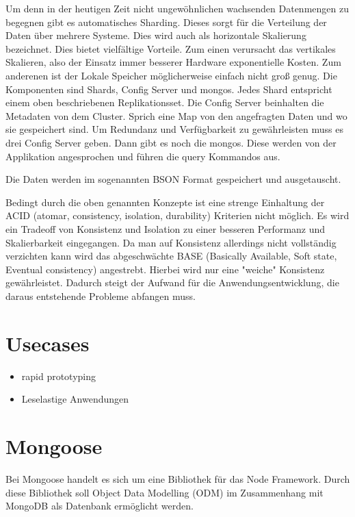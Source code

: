Um denn in der heutigen Zeit nicht ungewöhnlichen wachsenden Datenmengen
zu begegnen gibt es automatisches Sharding. Dieses sorgt für die
Verteilung der Daten über mehrere Systeme. Dies wird auch als
horizontale Skalierung bezeichnet. Dies bietet vielfältige Vorteile. Zum
einen verursacht das vertikales Skalieren, also der Einsatz immer
besserer Hardware exponentielle Kosten. Zum anderenen ist der Lokale
Speicher möglicherweise einfach nicht groß genug. Die Komponenten sind
Shards, Config Server und mongos. Jedes Shard entspricht einem oben
beschriebenen Replikationsset. Die Config Server beinhalten die
Metadaten von dem Cluster. Sprich eine Map von den angefragten Daten und
wo sie gespeichert sind. Um Redundanz und Verfügbarkeit zu gewährleisten
muss es drei Config Server geben. Dann gibt es noch die mongos. Diese
werden von der Applikation angesprochen und führen die query Kommandos
aus.

Die Daten werden im sogenannten BSON Format gespeichert und
ausgetauscht.

Bedingt durch die oben genannten Konzepte ist eine strenge Einhaltung der ACID (atomar, consistency, isolation, durability) Kriterien nicht möglich. Es wird ein Tradeoff von Konsistenz und Isolation zu einer besseren Performanz und Skalierbarkeit eingegangen. Da man auf Konsistenz allerdings nicht vollständig verzichten kann wird das abgeschwächte BASE (Basically Available, Soft state, Eventual consistency) angestrebt. Hierbei wird nur eine "weiche" Konsistenz gewährleistet. Dadurch steigt der Aufwand für die Anwendungsentwicklung, die daraus entstehende Probleme abfangen muss.

\section{Usecases}\label{usecases}

\begin{itemize}
\itemsep1pt\parskip0pt
\item
  rapid prototyping
\item
  Leselastige Anwendungen
\end{itemize}

\section{Mongoose}\label{mongoose}

Bei Mongoose handelt es sich um eine Bibliothek für das Node Framework. Durch diese Bibliothek soll Object Data Modelling (ODM) im Zusammenhang mit MongoDB als Datenbank ermöglicht werden.

